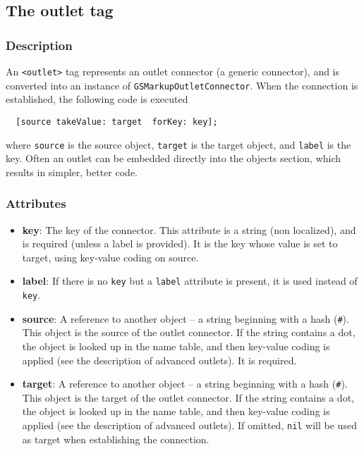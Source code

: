 \subsection{The outlet tag}

\subsubsection{Description}
An \texttt{<outlet>} tag represents an outlet connector (a generic
connector), and is converted into an instance of
\texttt{GSMarkupOutletConnector}.  When the connection is established,
the following code is executed
\begin{verbatim}
  [source takeValue: target  forKey: key];
\end{verbatim}
where \texttt{source} is the source object, \texttt{target} is the
target object, and \texttt{label} is the key.  Often an outlet can be
embedded directly into the objects section, which results in simpler,
better code.

\subsubsection{Attributes}
\begin{itemize}
\item {\bf key}: The key of the connector.  This attribute is a string 
(non localized), and is required (unless a label is provided).  It is
the key whose value is set to target, using key-value coding on
source.
\item {\bf label}: If there is no \texttt{key} but a \texttt{label} attribute
is present, it is used instead of \texttt{key}.
\item {\bf source}: A reference to another object -- a string beginning with
a hash (\texttt{\#}).  This object is the source of the outlet
connector.  If the string contains a dot, the object is looked up in
the name table, and then key-value coding is applied (see the
description of advanced outlets).  It is required.
\item {\bf target}: A reference to another object -- a string beginning with
a hash (\texttt{\#}).  This object is the target of the outlet
connector.  If the string contains a dot, the object is looked up in
the name table, and then key-value coding is applied (see the
description of advanced outlets).  If omitted, \texttt{nil} will be
used as target when establishing the connection.
\end{itemize}

